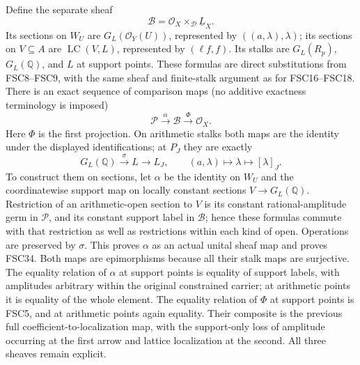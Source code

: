 Define the separate sheaf
\[
 \mathcal B=\mathcal O_X\mathbin{\times}_{\mathcal D}\underline L_X.
\]
Its sections on $W_U$ are $G_L(\mathcal O_Y(U))$, represented by
$((a,\lambda),\lambda)$; its sections on $V\subseteq A$ are
$\operatorname{LC}(V,L)$, represented by $(\ell f,f)$.
Its stalks are $G_L(R_p)$, $G_L(\mathbb Q)$, and $L$ at support
points. These formulas are direct substitutions from FSC8--FSC9,
with the same sheaf and finite-stalk argument as for FSC16--FSC18.
There is an exact sequence of comparison maps (no additive exactness
terminology is imposed)
\begin{equation}\tag{FSC33}
 \mathcal P\xrightarrow{\alpha}\mathcal B
                       \xrightarrow{\Phi}\mathcal O_X.
\end{equation}
Here $\Phi$ is the first projection. On arithmetic stalks both maps
are the identity under the displayed identifications; at $P_J$ they
are exactly
\begin{equation}\tag{FSC34}
 G_L(\mathbb Q)\xrightarrow{\sigma}L
                   \longrightarrow L_J,\qquad
 (a,\lambda)\longmapsto\lambda\longmapsto[\lambda]_J.
\end{equation}
To construct them on sections, let $\alpha$ be the identity on $W_U$
and the coordinatewise support map on locally constant sections
$V\to G_L(\mathbb Q)$. Restriction of an arithmetic-open section to
$V$ is its constant rational-amplitude germ in $\mathcal P$, and
its constant support label in $\mathcal B$; hence these formulas
commute with that restriction as well as restrictions within each
kind of open. Operations are preserved by $\sigma$. This proves
$\alpha$ as an actual unital sheaf map and proves FSC34.
Both maps are epimorphisms because all their stalk maps are surjective.
The equality relation of $\alpha$ at support points is equality of
support labels, with amplitudes arbitrary within the original
constrained carrier; at arithmetic points it is equality of the whole
element. The equality relation of $\Phi$ at support points is FSC5,
and at arithmetic points again equality. Their composite is the
previous full coefficient-to-localization map, with the support-only
loss of amplitude occurring at the first arrow and lattice localization
at the second. All three sheaves remain explicit.

